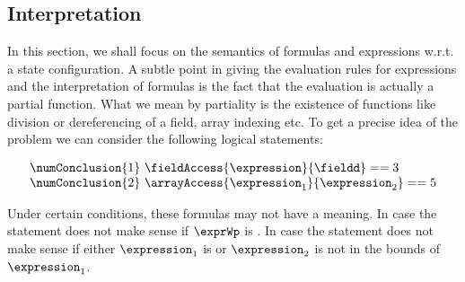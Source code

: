 
\newtheorem{interpretation}{Definition}[section]


\subsection{Interpretation}\label{interpret}
%
In this section, we shall focus on the semantics of formulas and expressions w.r.t. a state configuration.
A subtle point in giving the evaluation rules for expressions and the interpretation of formulas
is the fact that the evaluation is actually  a partial function.%
What we mean by partiality is the existence of functions like division or dereferencing of a field, array indexing etc. 
To get a precise idea of the problem we can consider the following logical statements: 

$$
\begin{array}{l} 
\numConclusion{1} \  \fieldAccess{\expression}{\fieldd} == 3\\
\numConclusion{2} \ \arrayAccess{\expression_1} {\expression_2} == 5
\end{array}
$$   

Under certain conditions, these formulas may not have a meaning. In case 
  the statement does not make sense if
$\exprWp$ is \Mynull. In case    the statement does not make sense if 
either $\expression_1 $ is \Mynull{} or $\expression_2$  is not in the bounds of $\expression_1 $.


